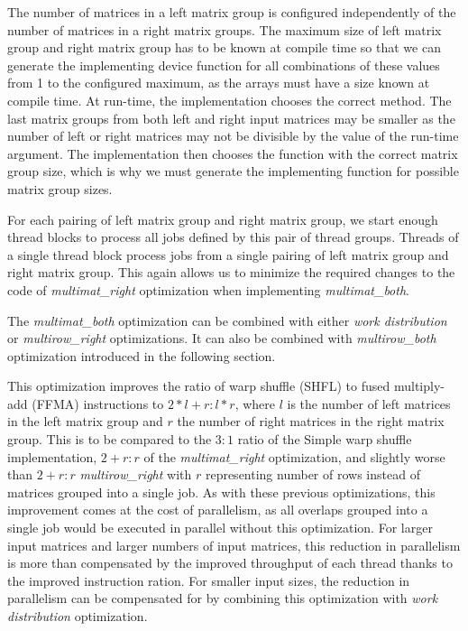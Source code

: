 The number of matrices in a left matrix group is configured independently of the number of matrices in a right matrix groups. The maximum size of left matrix group and right matrix group has to be known at compile time so that we can generate the implementing device function for all combinations of these values from 1 to the configured maximum, as the arrays must have a size known at compile time. At run-time, the implementation chooses the correct method. The last matrix groups from both left and right input matrices may be smaller as the number of left or right matrices may not be divisible by the value of the run-time argument. The implementation then chooses the function with the correct matrix group size, which is why we must generate the implementing function for possible matrix group sizes.

For each pairing of left matrix group and right matrix group, we start enough thread blocks to process all jobs defined by this pair of thread groups. Threads of a single thread block process jobs from a single pairing of left matrix group and right matrix group. This again allows us to minimize the required changes to the code of \textit{multimat\_right} optimization when implementing \textit{multimat\_both}.


The \textit{multimat\_both} optimization can be combined with either \textit{work distribution} or \textit{multirow\_right} optimizations. It can also be combined with \textit{multirow\_both} optimization introduced in the following section.



This optimization improves the ratio of warp shuffle (SHFL) to fused multiply-add (FFMA) instructions to $ 2 * l + r : l * r$, where $l$ is the number of left matrices in the left matrix group and $r$ the number of right matrices in the right matrix group. This is to be compared to the $3:1$ ratio of the Simple warp shuffle implementation, $2 + r : r$ of the \textit{multimat\_right} optimization, and slightly worse than $2 + r : r$ \textit{multirow\_right} with $r$ representing number of rows instead of matrices grouped into a single job. As with these previous optimizations, this improvement comes at the cost of parallelism, as all overlaps grouped into a single job would be executed in parallel without this optimization. For larger input matrices and larger numbers of input matrices, this reduction in parallelism is more than compensated by the improved throughput of each thread thanks to the improved instruction ration. For smaller input sizes, the reduction in parallelism can be compensated for by combining this optimization with \textit{work distribution} optimization.




